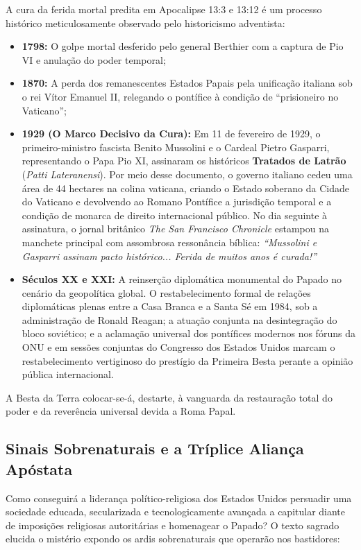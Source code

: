 A cura da ferida mortal predita em Apocalipse 13:3 e 13:12 é um processo histórico meticulosamente observado pelo historicismo adventista:
\begin{itemize}
  \item \textbf{1798:} O golpe mortal desferido pelo general Berthier com a captura de Pio VI e anulação do poder temporal;
  \item \textbf{1870:} A perda dos remanescentes Estados Papais pela unificação italiana sob o rei Vítor Emanuel II, relegando o pontífice à condição de ``prisioneiro no Vaticano'';
  \item \textbf{1929 (O Marco Decisivo da Cura):} Em 11 de fevereiro de 1929, o primeiro-ministro fascista Benito Mussolini e o Cardeal Pietro Gasparri, representando o Papa Pio XI, assinaram os históricos \textbf{Tratados de Latrão} (\textit{Patti Lateranensi}). Por meio desse documento, o governo italiano cedeu uma área de 44 hectares na colina vaticana, criando o Estado soberano da Cidade do Vaticano e devolvendo ao Romano Pontífice a jurisdição temporal e a condição de monarca de direito internacional público. No dia seguinte à assinatura, o jornal britânico \textit{The San Francisco Chronicle} estampou na manchete principal com assombrosa ressonância bíblica: \textit{``Mussolini e Gasparri assinam pacto histórico... Ferida de muitos anos é curada!''}
  \item \textbf{Séculos XX e XXI:} A reinserção diplomática monumental do Papado no cenário da geopolítica global. O restabelecimento formal de relações diplomáticas plenas entre a Casa Branca e a Santa Sé em 1984, sob a administração de Ronald Reagan; a atuação conjunta na desintegração do bloco soviético; e a aclamação universal dos pontífices modernos nos fóruns da ONU e em sessões conjuntas do Congresso dos Estados Unidos marcam o restabelecimento vertiginoso do prestígio da Primeira Besta perante a opinião pública internacional.
\end{itemize}


A Besta da Terra colocar-se-á, destarte, à vanguarda da restauração total do poder e da reverência universal devida a Roma Papal.



\subsection{Sinais Sobrenaturais e a Tríplice Aliança Apóstata}


Como conseguirá a liderança político-religiosa dos Estados Unidos persuadir uma sociedade educada, secularizada e tecnologicamente avançada a capitular diante de imposições religiosas autoritárias e homenagear o Papado? O texto sagrado elucida o mistério expondo os ardis sobrenaturais que operarão nos bastidores:


